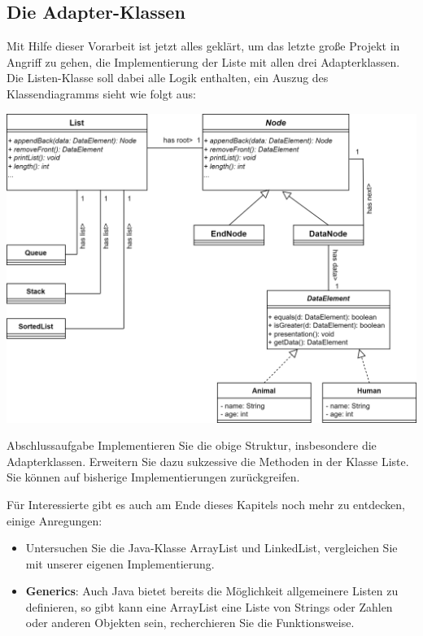 \documentclass{article}
\begin{document}
\subsection{Die Adapter-Klassen}
Mit Hilfe dieser Vorarbeit ist jetzt alles geklärt, um das letzte große Projekt in Angriff zu gehen, die Implementierung der Liste mit allen drei Adapterklassen. \\
Die Listen-Klasse soll dabei alle Logik enthalten, ein Auszug des Klassendiagramms sieht wie folgt aus:
\begin{center}
    \includegraphics[scale=0.2]{../media/adapter_lists.png}   
\end{center}
\begin{task}{Abschlussaufgabe}
Implementieren Sie die obige Struktur, insbesondere die Adapterklassen. Erweitern Sie dazu sukzessive die Methoden in der Klasse Liste. Sie können auf bisherige Implementierungen zurückgreifen. 
\end{task}
Für Interessierte gibt es auch am Ende dieses Kapitels noch mehr zu entdecken, einige Anregungen: 
\begin{itemize}
    \item Untersuchen Sie die Java-Klasse ArrayList und LinkedList, vergleichen Sie mit unserer eigenen Implementierung.
    \item \textbf{Generics}: Auch Java bietet bereits die Möglichkeit allgemeinere Listen zu definieren, so gibt kann eine ArrayList eine Liste von Strings oder Zahlen oder anderen Objekten sein, recherchieren Sie die Funktionsweise.
\end{itemize}
\end{document}
